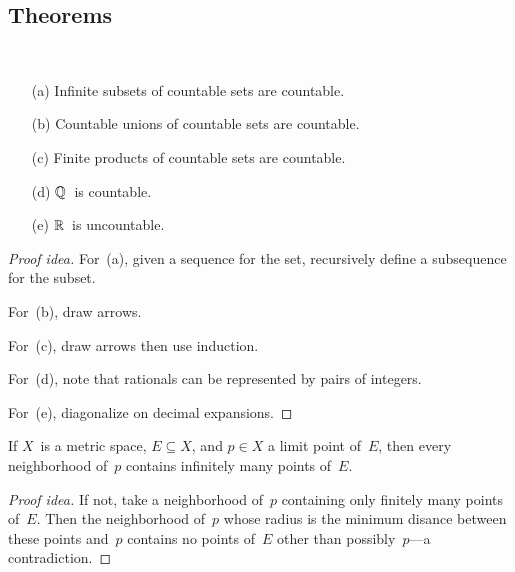 \subsection*{Theorems}
\begin{thm}
\ 
\begin{enumerate}[itemsep=0pt]
\item[(a)] Infinite subsets of countable sets are countable.
\item[(b)] Countable unions of countable sets are countable.
\item[(c)] Finite products of countable sets are countable.
\item[(d)] \(\mathbb{Q}\)~is countable.
\item[(e)] \(\mathbb{R}\)~is uncountable.
\end{enumerate}
\end{thm}
\begin{proof}[Proof idea]
For~(a), given a sequence for the set, recursively define a subsequence for the subset.

For~(b), draw arrows.

For~(c), draw arrows then use induction.

For~(d), note that rationals can be represented by pairs of integers.

For~(e), diagonalize on decimal expansions.
\end{proof}

\begin{thm}
If \(X\)~is a metric space, \(E\subseteq X\), and \(p\in X\) a limit point of~\(E\), then every neighborhood of~\(p\) contains infinitely many points of~\(E\).
\end{thm}
\begin{proof}[Proof idea]
If not, take a neighborhood of~\(p\) containing only finitely many points of~\(E\). Then the neighborhood of~\(p\) whose radius is the minimum disance between these points and~\(p\) contains no points of~\(E\) other than possibly~\(p\)---a contradiction.
\end{proof}


